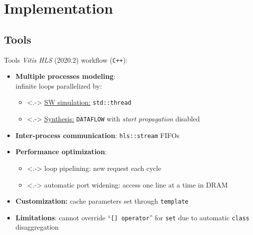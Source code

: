 \documentclass[handout,aspectratio=169]{beamer}
\begin{document}
\section{Implementation}
\subsection{Tools}
\begin{frame}{Tools}
	\emph{Vitis HLS} (2020.2) workflow (\texttt{C++}):
	\pause
	\begin{itemize}[<+->]
		\item \textbf{Multiple processes modeling}:\\
			infinite loops parallelized by:
			\begin{itemize}
				\item<.-> \underline{SW simulation:} \texttt{std::thread}
				\item<.-> \underline{Synthesis:} \texttt{DATAFLOW} with
					\textit{start propagation} disabled
			\end{itemize}
		\item \textbf{Inter-process communication}: \texttt{hls::stream} FIFOs
		\item \textbf{Performance optimization}:
			\begin{itemize}
				\item<.-> loop pipelining: new request each cycle
				\item<.-> automatic port widening: access one line at a time in DRAM
			\end{itemize}
		\item \textbf{Customization:} cache parameters set through \texttt{template}
		\item \textbf{Limitations}: cannot override ``\texttt{[]~operator}''
			for \texttt{set} due to automatic \texttt{class} disaggregation
	\end{itemize}
\end{frame}
\end{document}
